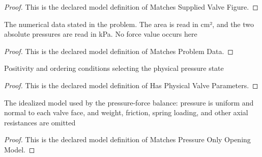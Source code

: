 \begin{proof}
  This is the declared model definition of Matches Supplied Valve Figure.
\end{proof}
\begin{definition}
  \label{def:physics:phyx-mini-0383:phyxminiproblems-problemphyxmini0383-matchesproblemdata}
  The numerical data stated in the problem. The area is read in cm², and the two absolute pressures are read in kPa. No force value occurs here
\end{definition}
\begin{proof}
  This is the declared model definition of Matches Problem Data.
\end{proof}
\begin{definition}
  \label{def:physics:phyx-mini-0383:phyxminiproblems-problemphyxmini0383-hasphysicalvalveparameters}
  Positivity and ordering conditions selecting the physical pressure state
\end{definition}
\begin{proof}
  This is the declared model definition of Has Physical Valve Parameters.
\end{proof}
\begin{definition}
  \label{def:physics:phyx-mini-0383:phyxminiproblems-problemphyxmini0383-matchespressureonlyopeningmodel}
  The idealized model used by the pressure-force balance: pressure is uniform and normal to each valve face, and weight, friction, spring loading, and other axial resistances are omitted
\end{definition}
\begin{proof}
  This is the declared model definition of Matches Pressure Only Opening Model.
\end{proof}
